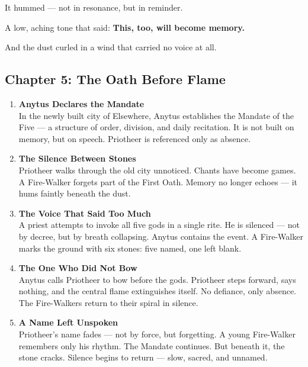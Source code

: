 \documentclass[9pt]{article}
\begin{document}
It hummed —  
not in resonance,  
but in reminder.

A low, aching tone  
that said:  
 \textbf{This, too, will become memory.}

And the dust curled in a wind  
that carried no voice at all.

\newpage

\subsection*{Chapter 5: The Oath Before Flame}

\vspace{1in}

\begin{center}
\begin{enumerate}
    \item \textbf{Anytus Declares the Mandate} \\
    In the newly built city of Elsewhere, Anytus establishes the Mandate of the Five — a structure of order, division, and daily recitation. It is not built on memory, but on speech. Priotheer is referenced only as absence.

    \vspace{1in}
    \item \textbf{The Silence Between Stones} \\
    Priotheer walks through the old city unnoticed. Chants have become games. A Fire-Walker forgets part of the First Oath. Memory no longer echoes — it hums faintly beneath the dust.

    \vspace{1in}
    \item \textbf{The Voice That Said Too Much} \\
    A priest attempts to invoke all five gods in a single rite. He is silenced — not by decree, but by breath collapsing. Anytus contains the event. A Fire-Walker marks the ground with six stones: five named, one left blank.

    \vspace{1in}
    \item \textbf{The One Who Did Not Bow} \\
    Anytus calls Priotheer to bow before the gods. Priotheer steps forward, says nothing, and the central flame extinguishes itself. No defiance, only absence. The Fire-Walkers return to their spiral in silence.

    \vspace{1in}
    \item \textbf{A Name Left Unspoken} \\
    Priotheer’s name fades — not by force, but forgetting. A young Fire-Walker remembers only his rhythm. The Mandate continues. But beneath it, the stone cracks. Silence begins to return — slow, sacred, and unnamed.
\end{enumerate}
\end{center}
\end{document}
